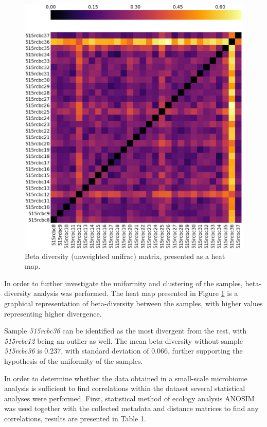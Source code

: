 \documentclass[12pt,twocolumn]{article} %
\begin{document}
\begin{figure}[ht!] %
	\includegraphics[width=\linewidth]{unweighted_beta.png}
	\caption{Beta diversity (unweighted unifrac) matrix, presented as a heat map.}
	\label{fig:beta_diversity}
\end{figure}
\par
In order to further investigate the uniformity and clustering of the samples, beta-diversity analysis was performed. The heat map presented in Figure \ref{fig:beta_diversity} is a graphical representation of beta-diversity between the samples, with higher values representing higher divergence.
\par
Sample \textit{515rcbc36} can be identified as the most divergent from the rest, with \textit{515rcbc12} being an outlier as well. The mean beta-diversity without sample \textit{515rcbc36} is 0.237, with standard deviation of 0.066, further supporting the hypothesis of the uniformity of the samples.
\par
In order to determine whether the data obtained in a small-scale microbiome analysis is sufficient to find correlations within the dataset several statistical analyses were performed. First, statistical method of ecology analysis ANOSIM\cite{CLARKE1993} was used together with the collected metadata and distance matrices to find any correlations, results are presented in Table 1.
\end{document}

